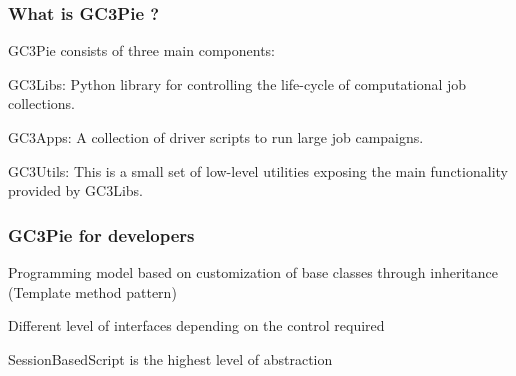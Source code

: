 \documentclass[english,serif,mathserif,xcolor=pdftex,dvipsnames,table]{beamer}
\begin{document}
\begin{frame}
\frametitle{What is GC3Pie ?}

  GC3Pie consists of three main components:

  \begin{block}{GC3Libs:} Python library for controlling the life-cycle of computational job collections. \end{block}
  \begin{block}{GC3Apps:} A collection of driver scripts to run large job campaigns. \end{block}
  \begin{block}{GC3Utils:} This is a small set of low-level utilities exposing the main functionality provided by GC3Libs. \end{block}
\end{frame}






\begin{frame}
  \frametitle{GC3Pie for developers}
    \begin{block}{}
      Programming model based on customization of base classes through
      inheritance ({\color{Blue}Template method} pattern)
    \end{block}

    \begin{block}{}
      Different level of {\color{Blue}interfaces} depending on the control required
    \end{block}

    \begin{block}{}
      {\color{Blue}SessionBasedScript} is the highest level of abstraction
    \end{block}
\end{frame}
\end{document}
